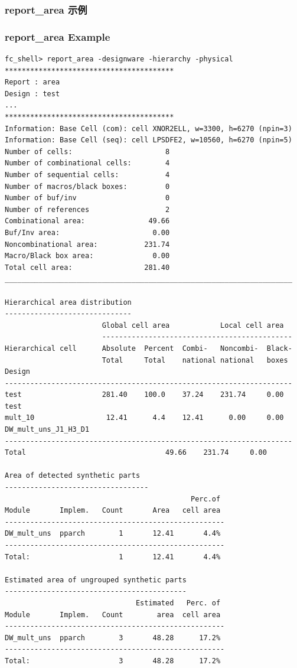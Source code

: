 \subsubsection{report\_area 示例}
\subsubsection*{report\_area Example}

\begin{lstlisting}
fc_shell> report_area -designware -hierarchy -physical
****************************************
Report : area
Design : test
...
****************************************
Information: Base Cell (com): cell XNOR2ELL, w=3300, h=6270 (npin=3)
Information: Base Cell (seq): cell LPSDFE2, w=10560, h=6270 (npin=5)
Number of cells:                      8
Number of combinational cells:        4
Number of sequential cells:           4
Number of macros/black boxes:         0
Number of buf/inv                     0
Number of references                  2
Combinational area:               49.66
Buf/Inv area:                      0.00
Noncombinational area:           231.74
Macro/Black box area:              0.00
Total cell area:                 281.40
____________________________________________________________________

Hierarchical area distribution
------------------------------
                       Global cell area            Local cell area
                       ---------------------------------------------
Hierarchical cell      Absolute  Percent  Combi-   Noncombi-  Black-
                       Total     Total    national national   boxes
Design
--------------------------------------------------------------------
test                   281.40    100.0    37.24    231.74     0.00
test
mult_10                 12.41      4.4    12.41      0.00     0.00
DW_mult_uns_J1_H3_D1
--------------------------------------------------------------------
Total                                 49.66    231.74     0.00

Area of detected synthetic parts
----------------------------------
                                            Perc.of
Module       Implem.   Count       Area   cell area
----------------------------------------------------
DW_mult_uns  pparch        1       12.41       4.4%
----------------------------------------------------
Total:                     1       12.41       4.4%

Estimated area of ungrouped synthetic parts
-------------------------------------------
                               Estimated   Perc. of
Module       Implem.   Count        area  cell area
----------------------------------------------------
DW_mult_uns  pparch        3       48.28      17.2%
----------------------------------------------------
Total:                     3       48.28      17.2%


\end{lstlisting}
